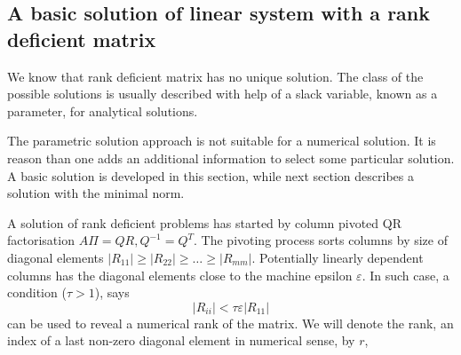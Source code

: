 \begin{refsection}
\subsection{A basic solution of linear system with a rank deficient matrix}
\label{subsec:basic}

We know that rank deficient matrix has no unique solution.
The class of the possible solutions is usually described
with help of a slack variable, known as a parameter,
for analytical solutions.

The parametric solution approach is not suitable for a numerical
solution. It is reason than one adds an additional information
to select some particular solution. A basic solution is developed
in this section, while next section describes a solution
with the minimal norm.

A solution of rank deficient problems has started by column pivoted
QR factorisation $A \Pi = QR, Q^{-1} = Q^T$. The pivoting process sorts columns
by size of diagonal elements
$\lvert R_{11} \rvert \ge \lvert R_{22} \rvert \ge \ldots \ge \lvert R_{mm} \rvert $.
Potentially linearly dependent columns has the diagonal elements close
to the machine epsilon $\varepsilon$. In such case, a condition
($\tau > 1$), says
\begin{equation}
  \lvert R_{ii} \rvert < \tau \varepsilon \lvert R_{11} \rvert
\end{equation}
can be used to reveal a numerical rank of the matrix. We will
denote the rank, an index of a last non-zero diagonal element in numerical
sense, by $r$,


\end{refsection}
